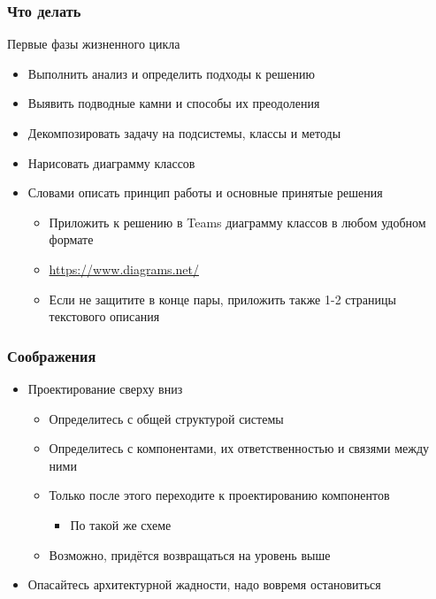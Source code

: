 \documentclass[xetex,mathserif,serif]{beamer}
\begin{document}
    \begin{frame}
        \frametitle{Что делать}
        Первые фазы жизненного цикла
        \begin{itemize}
            \item Выполнить анализ и определить подходы к решению
            \item Выявить подводные камни и способы их преодоления
            \item Декомпозировать задачу на подсистемы, классы и методы
            \item Нарисовать диаграмму классов
            \item Словами описать принцип работы и основные принятые решения
            \begin{itemize}
                \item Приложить к решению в Teams диаграмму классов в любом удобном формате
                \item \url{https://www.diagrams.net/}
                \item Если не защитите в конце пары, приложить также 1-2 страницы текстового описания
            \end{itemize}
        \end{itemize}
    \end{frame}

    \begin{frame}
        \frametitle{Соображения}
        \begin{itemize}
            \item Проектирование сверху вниз
            \begin{itemize}
                \item Определитесь с общей структурой системы
                \item Определитесь с компонентами, их ответственностью и связями между ними
                \item Только после этого переходите к проектированию компонентов
                \begin{itemize}
                    \item По такой же схеме
                \end{itemize}
                \item Возможно, придётся возвращаться на уровень выше
            \end{itemize}
            \item Опасайтесь архитектурной жадности, надо вовремя остановиться
        \end{itemize}
    \end{frame}
\end{document}
